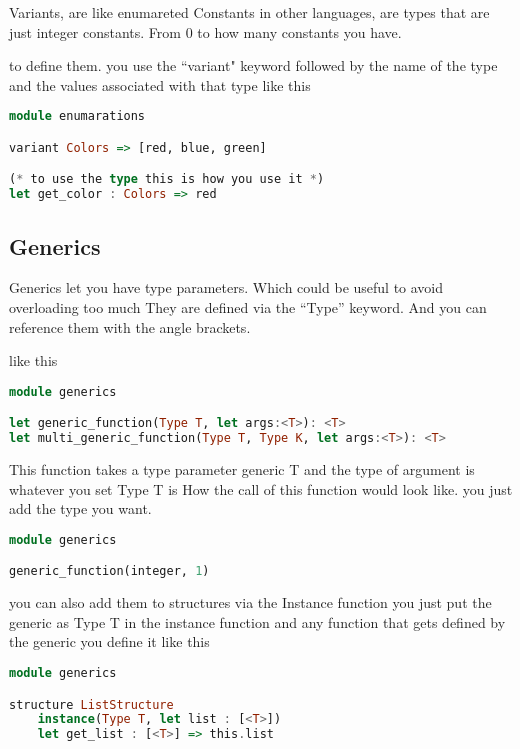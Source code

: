 \documentclass{article}
\begin{document}
Variants, are like enumareted Constants in other languages, are types that are just integer constants.
From 0 to how many constants you have. 

to define them. you use the ``variant" keyword followed by the name of the type 
and the values associated with that type like this
 

\begin{lstlisting}[language=Haskell]
module enumarations

variant Colors => [red, blue, green]

(* to use the type this is how you use it *)
let get_color : Colors => red
\end{lstlisting}



\subsection{Generics}

Generics let you have type parameters. Which could be useful to avoid overloading too much 
They are defined via the ``Type” keyword. And you can reference them with the angle brackets. 

like this 

\begin{lstlisting}[language=Haskell]
module generics

let generic_function(Type T, let args:<T>): <T>
let multi_generic_function(Type T, Type K, let args:<T>): <T>

\end{lstlisting}


This function takes a type parameter generic T and the type of argument is whatever you set Type T is
How the call of this function would look like. you just add the type you want.


\begin{lstlisting}[language=Haskell]
module generics

generic_function(integer, 1)

\end{lstlisting}

you can also add them to structures via the Instance function
you just put the generic as Type T in the instance function
and any function that gets defined by the generic you define it like this

\begin{lstlisting}[language=Haskell]
module generics

structure ListStructure
    instance(Type T, let list : [<T>])
    let get_list : [<T>] => this.list

\end{lstlisting}
\end{document}

